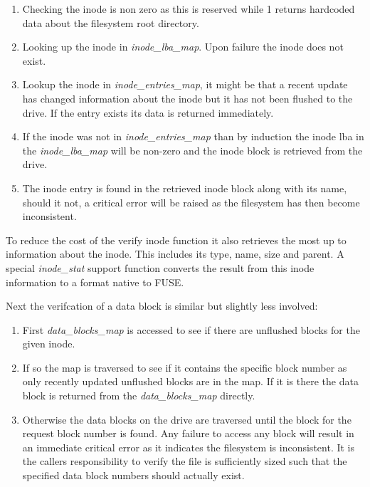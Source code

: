 \begin{enumerate}
    \item Checking the inode is non zero as this is reserved while 1 returns
    hardcoded data about the filesystem root directory. 
    \item Looking up the inode in \textit{inode\_lba\_map}. Upon failure the
    inode does not exist.
    \item Lookup the inode in \textit{inode\_entries\_map}, it might be that a
    recent update has changed information about the inode but it has not been
    flushed to the drive. If the entry exists its data is returned immediately.
    \item If the inode was not in \textit{inode\_entries\_map} than by induction
    the inode lba in the \textit{inode\_lba\_map} will be non-zero and the inode
    block is retrieved from the drive.
    \item The inode entry is found in the retrieved inode block along with its
    name, should it not, a critical error will be raised as the filesystem has
    then become inconsistent.
\end{enumerate}

To reduce the cost of the verify inode function it also retrieves the most up
to information about the inode. This includes its type, name, size and parent.
A special \textit{inode\_stat} support function converts the result from this
inode information to a format native to FUSE.

Next the verifcation of a data block is similar but slightly less involved:

\begin{enumerate}
    \item First \textit{data\_blocks\_map} is accessed to see if there are
    unflushed blocks for the given inode.
    \item If so the map is traversed to see if it contains the specific block
    number as only recently updated unflushed blocks are in the map. If it is
    there the data block is returned from the \textit{data\_blocks\_map}
    directly.
    \item Otherwise the data blocks on the drive are traversed until the
    block for the request block number is found. Any failure to access any block
    will result in an immediate critical error as it indicates the filesystem
    is inconsistent. It is the callers responsibility to verify the file is
    sufficiently sized such that the specified data block numbers should
    actually exist.
\end{enumerate}

